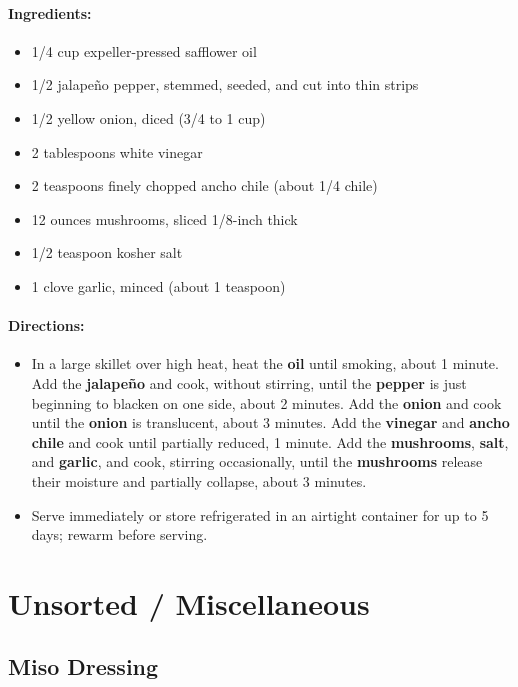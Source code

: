 \documentclass{article}
\begin{document}
\paragraph{Ingredients:}
\begin{itemize}
    \item 1/4 cup expeller-pressed safflower oil
    \item 1/2 jalapeño pepper, stemmed, seeded, and cut into thin strips
    \item 1/2 yellow onion, diced (3/4 to 1 cup)
    \item 2 tablespoons white vinegar
    \item 2 teaspoons finely chopped ancho chile (about 1/4 chile)
    \item 12 ounces mushrooms, sliced 1/8-inch thick
    \item 1/2 teaspoon kosher salt
    \item 1 clove garlic, minced (about 1 teaspoon)
\end{itemize}

\paragraph{Directions:}
\begin{itemize}
    \item In a large skillet over high heat, heat the \textbf{oil} until smoking, about 1 minute. Add the \textbf{jalapeño} and cook, without stirring, until the \textbf{pepper} is just beginning to blacken on one side, about 2 minutes. Add the \textbf{onion} and cook until the \textbf{onion} is translucent, about 3 minutes. Add the \textbf{vinegar} and \textbf{ancho chile} and cook until partially reduced, 1 minute. Add the \textbf{mushrooms}, \textbf{salt}, and \textbf{garlic}, and cook, stirring occasionally, until the \textbf{mushrooms} release their moisture and partially collapse, about 3 minutes.
    \item Serve immediately or store refrigerated in an airtight container for up to 5 days; rewarm before serving.
\end{itemize}

\section{Unsorted / Miscellaneous}


\subsection{Miso Dressing}
\end{document}
